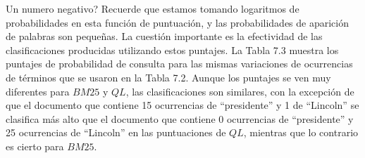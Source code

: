Un numero negativo? Recuerde que estamos tomando logaritmos de probabilidades en esta función de puntuación, y las probabilidades de aparición de palabras son pequeñas. La cuestión importante es la efectividad de las clasificaciones producidas utilizando estos puntajes. La Tabla 7.3 muestra los puntajes de probabilidad de consulta para las mismas variaciones de ocurrencias de términos que se usaron en la Tabla 7.2. Aunque los puntajes se ven muy diferentes para $BM25$ y $QL$, las clasificaciones son similares, con la excepción de que el documento que contiene 15 ocurrencias de ``presidente'' y 1 de ``Lincoln'' se clasifica más alto que el documento que contiene 0 ocurrencias de ``presidente'' y 25 ocurrencias de ``Lincoln'' en las puntuaciones de $QL$, mientras que lo contrario es cierto para $BM25$.

